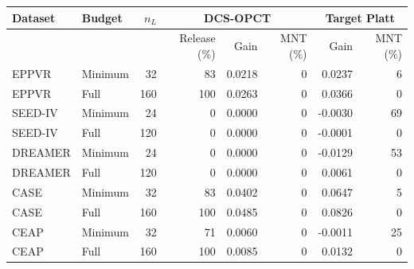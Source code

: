 \begin{tabular}{llrrrrrr}
\toprule
Dataset & Budget & $n_L$ & \multicolumn{3}{c}{DCS-OPCT} & \multicolumn{2}{c}{Target Platt} \\
\hline
 & & & Release (\%) & Gain & MNT (\%) & Gain & MNT (\%) \\
\midrule
EPPVR & Minimum & 32 & 83 & 0.0218 & 0 & 0.0237 & 6 \\
EPPVR & Full & 160 & 100 & 0.0263 & 0 & 0.0366 & 0 \\
SEED-IV & Minimum & 24 & 0 & 0.0000 & 0 & -0.0030 & 69 \\
SEED-IV & Full & 120 & 0 & 0.0000 & 0 & -0.0001 & 0 \\
DREAMER & Minimum & 24 & 0 & 0.0000 & 0 & -0.0129 & 53 \\
DREAMER & Full & 120 & 0 & 0.0000 & 0 & 0.0061 & 0 \\
CASE & Minimum & 32 & 83 & 0.0402 & 0 & 0.0647 & 5 \\
CASE & Full & 160 & 100 & 0.0485 & 0 & 0.0826 & 0 \\
CEAP & Minimum & 32 & 71 & 0.0060 & 0 & -0.0011 & 25 \\
CEAP & Full & 160 & 100 & 0.0085 & 0 & 0.0132 & 0 \\
\bottomrule
\end{tabular}
